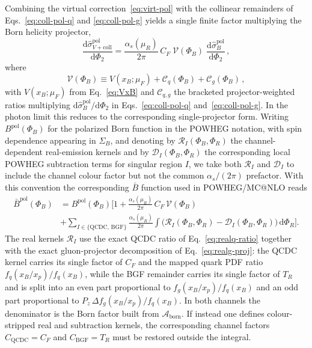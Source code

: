 \documentclass[a4paper,11pt]{article}
\begin{document}
Combining the virtual correction~\eqref{eq:virt-pol} with the collinear remainders of Eqs.~\eqref{eq:coll-pol-q} and \eqref{eq:coll-pol-g} yields a single finite factor multiplying the Born helicity projector,
\begin{equation}
\frac{\mathrm{d}\hat\sigma_{V+\text{coll}}^{\text{pol}}}{\mathrm{d}\Phi_2}
=
\frac{\alpha_s(\mu_R)}{2\pi}\,C_F\;
\mathcal{V}(\Phi_B)\;
\frac{\mathrm{d}\hat\sigma_B^{\text{pol}}}{\mathrm{d}\Phi_2}\,,
\label{eq:Vpluscoll-pol}
\end{equation}
where
\begin{equation}
\mathcal{V}(\Phi_B)\equiv V(x_B;\mu_F)
+\mathcal{C}_q(\Phi_B)+\mathcal{C}_g(\Phi_B)\,,
\label{eq:Vcal}
\end{equation}
with $V(x_B;\mu_F)$ from Eq.~\eqref{eq:VxB} and $\mathcal{C}_{q,g}$ the bracketed projector-weighted ratios multiplying $\mathrm{d}\hat\sigma_B^{\text{pol}}/\mathrm{d}\Phi_2$ in Eqs.~\eqref{eq:coll-pol-q} and~\eqref{eq:coll-pol-g}. In the photon limit this reduces to the corresponding single-projector form.
Writing $B^{\text{pol}}(\Phi_B)$ for the polarized Born function in the POWHEG notation, with spin dependence appearing in $\Sigma_B$, and denoting by $\mathcal{R}_I(\Phi_B,\Phi_R)$ the channel-dependent real-emission kernels and by $\mathcal{D}_I(\Phi_B,\Phi_R)$ the corresponding local POWHEG subtraction terms for singular region $I$, we take both $\mathcal{R}_I$ and $\mathcal{D}_I$ to include the channel colour factor but not the common $\alpha_s/(2\pi)$ prefactor. With this convention the corresponding $\bar B$ function used in POWHEG/MC@NLO reads
\begin{align}
\bar B^{\text{pol}}(\Phi_B)
&=B^{\text{pol}}(\Phi_B)\Bigg[
1+\frac{\alpha_s(\mu_R)}{2\pi}\,C_F\,\mathcal{V}(\Phi_B)
\nonumber \\[1mm]
&+\sum_{I\in\{\mathrm{QCDC},\,\mathrm{BGF}\}}
\frac{\alpha_s(\mu_R)}{2\pi}
\int\!\big(\mathcal{R}_I(\Phi_B,\Phi_R)-\mathcal{D}_I(\Phi_B,\Phi_R)\big)\,\mathrm{d}\Phi_R
\Bigg].
\label{eq:Bbar-pol}
\end{align}
The real kernels $\mathcal{R}_I$ use the exact QCDC ratio of Eq.~\eqref{eq:realq-ratio} together with the exact gluon-projector decomposition of Eq.~\eqref{eq:realg-proj}: the QCDC kernel carries its single factor of $C_F$ and the mapped quark PDF ratio $f_q(x_B/x_p)/f_q(x_B)$, while the BGF remainder carries its single factor of $T_R$ and is split into an even part proportional to $f_g(x_B/x_p)/f_q(x_B)$ and an odd part proportional to $P_z\,\Delta f_g(x_B/x_p)/f_q(x_B)$.  In both channels the denominator is the Born factor built from $\mathcal{A}_{\text{born}}$. If instead one defines colour-stripped real and subtraction kernels, the corresponding channel factors $C_{\mathrm{QCDC}}=C_F$ and $C_{\mathrm{BGF}}=T_R$ must be restored outside the integral.
\end{document}
